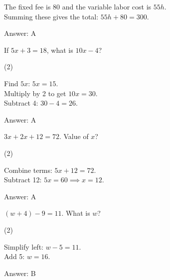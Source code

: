 \documentclass[11pt,paper=a4,answers]{exam}
\begin{document}
\begin{questions}
\begin{solution}
The fixed fee is 80 and the variable labor cost is $55h$. 
\\[10pt]
Summing these gives the total: $55h + 80 = 300$.

\vspace{20pt}
Answer: \colorbox{yellow!100}{A}
\end{solution}

\question
If $5x + 3 = 18$, what is $10x - 4$?
\begin{tasks}(2)
\end{tasks}

\begin{solution}
Find $5x$: $5x = 15$. 
\\[10pt]
Multiply by 2 to get $10x = 30$. 
\\[10pt]
Subtract 4: $30 - 4 = 26$.

\vspace{20pt}
Answer: \colorbox{yellow!100}{A}
\end{solution}

\question
$3x + 2x + 12 = 72$. Value of $x$?
\begin{tasks}(2)
\end{tasks}

\begin{solution}
Combine terms: $5x + 12 = 72$. 
\\[10pt]
Subtract 12: $5x = 60 \implies x = 12$.

\vspace{20pt}
Answer: \colorbox{yellow!100}{A}
\end{solution}

\question
$(w + 4) - 9 = 11$. What is $w$?
\begin{tasks}(2)
\end{tasks}

\begin{solution}
Simplify left: $w - 5 = 11$. 
\\[10pt]
Add 5: $w = 16$.

\vspace{20pt}
Answer: \colorbox{yellow!100}{B}
\end{solution}


\end{questions}
\end{document}

